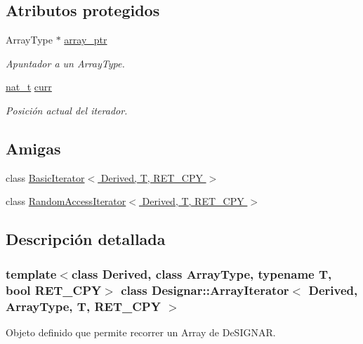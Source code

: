\subsection*{Atributos protegidos}
\begin{DoxyCompactItemize}
\item 
Array\+Type $\ast$ \hyperlink{class_designar_1_1_array_iterator_a6518c265f47bf58f4e2c04b55416ded6}{array\+\_\+ptr}
\begin{DoxyCompactList}\small\item\em Apuntador a un Array\+Type. \end{DoxyCompactList}\item 
\hyperlink{namespace_designar_aa72662848b9f4815e7bf31a7cf3e33d1}{nat\+\_\+t} \hyperlink{class_designar_1_1_array_iterator_aef9cd548a0423017eb452081f260a840}{curr}
\begin{DoxyCompactList}\small\item\em Posición actual del iterador. \end{DoxyCompactList}\end{DoxyCompactItemize}
\subsection*{Amigas}
\begin{DoxyCompactItemize}
\item 
class \hyperlink{class_designar_1_1_array_iterator_a780ba1bdf8ce9c4f60e364ab9ce0cd47}{Basic\+Iterator$<$ Derived, T, R\+E\+T\+\_\+\+C\+P\+Y $>$}
\item 
class \hyperlink{class_designar_1_1_array_iterator_af1665f0fe477bd4c26558c3f5cc620c3}{Random\+Access\+Iterator$<$ Derived, T, R\+E\+T\+\_\+\+C\+P\+Y $>$}
\end{DoxyCompactItemize}


\subsection{Descripción detallada}
\subsubsection*{template$<$class Derived, class Array\+Type, typename T, bool R\+E\+T\+\_\+\+C\+PY$>$\newline
class Designar\+::\+Array\+Iterator$<$ Derived, Array\+Type, T, R\+E\+T\+\_\+\+C\+P\+Y $>$}

Objeto definido que permite recorrer un Array de De\+S\+I\+G\+N\+AR. 

